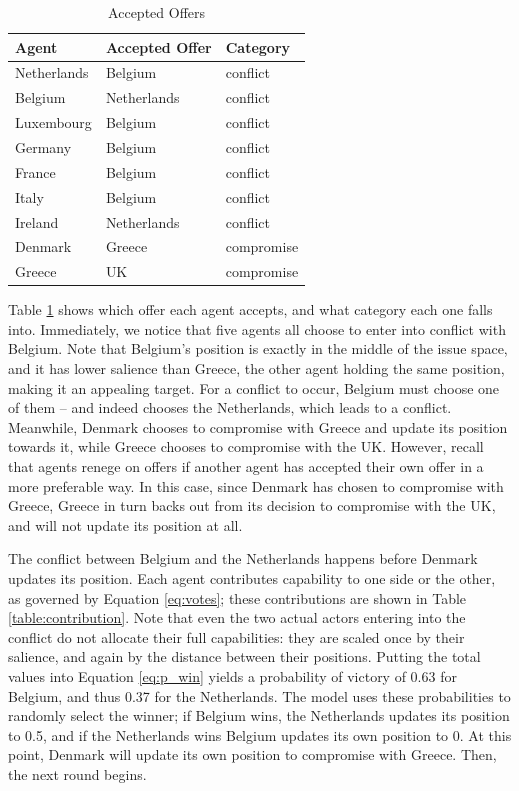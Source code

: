 \begin{table}
\centering
    \caption{Accepted Offers}
    \label{eg_offers}
\begin{tabular}{lll}
    \hline
    Agent &  Accepted Offer & Category \\
    \hline
    Netherlands & Belgium & conflict \\
    Belgium & Netherlands & conflict \\
    Luxembourg & Belgium & conflict \\
    Germany & Belgium & conflict \\
    France & Belgium & conflict \\
    Italy & Belgium & conflict \\
    Ireland & Netherlands & conflict \\
    Denmark & Greece & compromise \\
    Greece & UK & compromise \\
    \hline
\end{tabular}
\tableSpace

\end{table}

Table \ref{eg_offers} shows which offer each agent accepts, and what category each one falls into. Immediately, we notice that five agents all choose to enter into conflict with Belgium. Note that Belgium's position is exactly in the middle of the issue space, and it has lower salience than Greece, the other agent holding the same position, making it an appealing target. For a conflict to occur, Belgium must choose one of them -- and indeed chooses the Netherlands, which leads to a conflict. Meanwhile, Denmark chooses to compromise with Greece and update its position towards it, while Greece chooses to compromise with the UK. However, recall that agents renege on offers if another agent has accepted their own offer in a more preferable way. In this case, since Denmark has chosen to compromise with Greece, Greece in turn backs out from its decision to compromise with the UK, and will not update its position at all.

The conflict between Belgium and the Netherlands happens before Denmark updates its position. Each agent contributes capability to one side or the other, as governed by Equation \ref{eq:votes}; these contributions are shown in Table \ref{table:contribution}. Note that even the two actual actors entering into the conflict do not allocate their full capabilities: they are scaled once by their salience, and again by the distance between their positions. Putting the total values into Equation \ref{eq:p_win} yields a probability of victory of 0.63 for Belgium, and thus 0.37 for the Netherlands. The model uses these probabilities to randomly select the winner; if Belgium wins, the Netherlands updates its position to 0.5, and if the Netherlands wins Belgium updates its own position to 0. At this point, Denmark will update its own position to compromise with Greece. Then, the next round begins.


